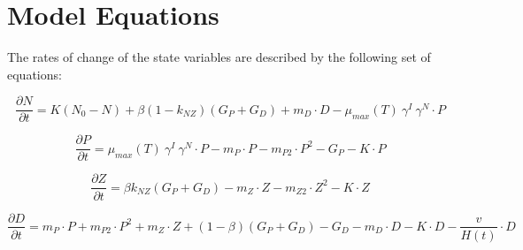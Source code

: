 \documentclass[journal abbreviation, manuscript]{copernicus}
\begin{document}
\section{Model Equations}
The rates of change of the state variables are described by the following set of equations:

\begin{equation}
    \frac{\partial N}{\partial t} = 
    K (N_0 - N) %
    + \beta(1 - k_{NZ})(G_P + G_D) %
    + m_D \cdot D %
    - \mu_{max}(T) \  \gamma^{I} \ \gamma^{N} \cdot P %
\end{equation}

\begin{equation}
    \frac{\partial P}{\partial t} =
    \mu_{max}(T) \  \gamma^{I} \ \gamma^{N} \cdot P  %
    - m_P \cdot P %
    - m_{P2} \cdot P^2 %
    - G_P %
    - K \cdot P %
\end{equation}

\begin{equation}
    \frac{\partial Z}{\partial t} =
    \beta k_{NZ}(G_P + G_D) %
    - m_Z \cdot Z %
    - m_{Z2} \cdot Z^2 %
    - K \cdot Z %
\end{equation}

\begin{equation}
    \frac{\partial D}{\partial t} = 
    m_P \cdot P %
    + m_{P2} \cdot P^2 %
    + m_Z \cdot Z %
    + (1 - \beta)(G_P + G_D) %
    - G_D %
    - m_D \cdot D %
    - K \cdot D %
    - \frac{v}{H(t)} \cdot D %
\end{equation}
\end{document}
